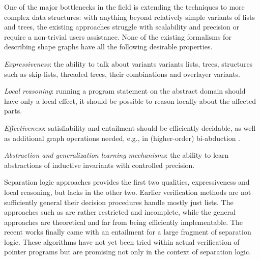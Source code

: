 {One of the major bottlenecks in the field is extending the techniques to more complex data structures: with anything beyond relatively simple variants of lists and trees,
%
the existing approaches 
struggle with scalability and precision or require a non-trivial users assistance.
%
None of the existing formalisms for describing shape graphs have all the following desirable properties.
\begin{inparaenum}
\item
\emph{Expressiveness}: the ability to talk about variants variants lists, trees, structures such as skip-lists, threaded trees, their combinations and overlayer variants.   
\item
\emph{Local reasoning}: running a program statement on the abstract domain should have only a local effect, it should be possible to reason locally about the affected parts.
\item
\emph{Effectiveness}: 
 satisfiability and entailment should be efficiently decidable, as well as additional graph operations needed, e.g., in (higher-order) bi-abduction \cite{abduction11,locle:secondorder}.
\item
\emph{Abstraction and generalization learning mechanisms}: the ability to learn abstractions of inductive invariants with controlled precision.
\end{inparaenum}
%

Separation logic approaches provides the first two qualities, 
expressiveness and local reasoning,
but lacks in the other two. 
%
Earlier verification methods are not sufficiently general their decision procedures handle mostly just lists. The approaches such as \cite{iosif_deciding_2014,enea_compositional_2014,ruzica_automating} are rather restricted and incomplete, while the general approaches \cite{iosif_treewidth_2013,matheja_treelike_2015} are theoretical and far from being efficiently implementable.
%
The recent works \cite{Katelaan:seplog,pagel,Iosif:CSL,Iosif:LPAR} finally came with an entailment for a large fragment of separation logic. These algorithms have not yet been tried within actual verification of pointer programs but are promising not only in the context of separation logic.

}
